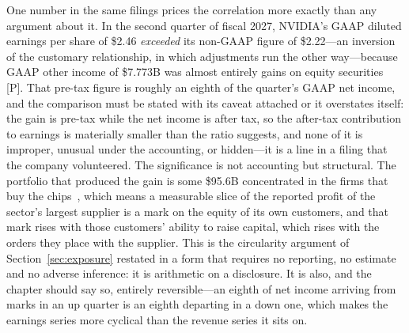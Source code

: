 One number in the same filings prices the correlation more exactly than any argument about it. In the second quarter of fiscal 2027, NVIDIA's GAAP diluted earnings per share of \$2.46 \emph{exceeded} its non-GAAP figure of \$2.22---an inversion of the customary relationship, in which adjustments run the other way---because GAAP other income of \$7.773B was almost entirely gains on equity securities~\cite{nvda-q2fy27} [P]. That pre-tax figure is roughly an eighth of the quarter's GAAP net income, and the comparison must be stated with its caveat attached or it overstates itself: the gain is pre-tax while the net income is after tax, so the after-tax contribution to earnings is materially smaller than the ratio suggests, and none of it is improper, unusual under the accounting, or hidden---it is a line in a filing that the company volunteered. The significance is not accounting but structural. The portfolio that produced the gain is some \$95.6B concentrated in the firms that buy the chips~\cite{nvda-exposure}, which means a measurable slice of the reported profit of the sector's largest supplier is a mark on the equity of its own customers, and that mark rises with those customers' ability to raise capital, which rises with the orders they place with the supplier. This is the circularity argument of Section~\ref{sec:exposure} restated in a form that requires no reporting, no estimate and no adverse inference: it is arithmetic on a disclosure. It is also, and the chapter should say so, entirely reversible---an eighth of net income arriving from marks in an up quarter is an eighth departing in a down one, which makes the earnings series more cyclical than the revenue series it sits on.

